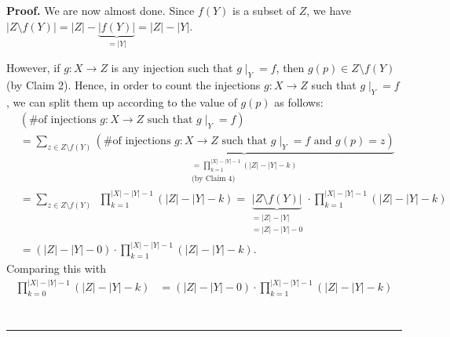 \documentclass[numbers=enddot,12pt,final,onecolumn,notitlepage]{scrartcl}%
\numberwithin{exer}{section}
\theoremstyle{definition}
\newenvironment{proof}[1][Proof]{\noindent\textbf{#1.} }{\ \rule{0.5em}{0.5em}}
\let\sumnonlimits\sum
\let\prodnonlimits\prod
\renewcommand{\sum}{\sumnonlimits\limits}
\renewcommand{\prod}{\prodnonlimits\limits}
\newenvironment{verlong}{}{}
\begin{document}
\begin{verlong}
\begin{proof}
We are now almost done. Since $f\left(  Y\right)  $ is a subset of $Z$, we
have $\left\vert Z\setminus f\left(  Y\right)  \right\vert =\left\vert
Z\right\vert -\underbrace{\left\vert f\left(  Y\right)  \right\vert
}_{=\left\vert Y\right\vert }=\left\vert Z\right\vert -\left\vert Y\right\vert
$.

However, if $g:X\rightarrow Z$ is any injection such that $\left.  g\mid
_{Y}\right.  =f$, then $g\left(  p\right)  \in Z\setminus f\left(  Y\right)  $
(by Claim 2). Hence, in order to count the injections $g:X\rightarrow Z$ such
that $\left.  g\mid_{Y}\right.  =f$, we can split them up according to the
value of $g\left(  p\right)  $ as follows:%
\begin{align*}
&  \left(  \text{\# of injections }g:X\rightarrow Z\text{ such that }\left.
g\mid_{Y}\right.  =f\right) \\
&  =\sum_{z\in Z\setminus f\left(  Y\right)  }\underbrace{\left(  \text{\# of
injections }g:X\rightarrow Z\text{ such that }\left.  g\mid_{Y}\right.
=f\text{ and }g\left(  p\right)  =z\right)  }_{\substack{=\prod_{k=1}%
^{\left\vert X\right\vert -\left\vert Y\right\vert -1}\left(  \left\vert
Z\right\vert -\left\vert Y\right\vert -k\right)  \\\text{(by Claim 4)}}}\\
&  =\sum_{z\in Z\setminus f\left(  Y\right)  }\ \ \prod_{k=1}^{\left\vert
X\right\vert -\left\vert Y\right\vert -1}\left(  \left\vert Z\right\vert
-\left\vert Y\right\vert -k\right)  =\underbrace{\left\vert Z\setminus
f\left(  Y\right)  \right\vert }_{\substack{=\left\vert Z\right\vert
-\left\vert Y\right\vert \\=\left\vert Z\right\vert -\left\vert Y\right\vert
-0}}\cdot\prod_{k=1}^{\left\vert X\right\vert -\left\vert Y\right\vert
-1}\left(  \left\vert Z\right\vert -\left\vert Y\right\vert -k\right) \\
&  =\left(  \left\vert Z\right\vert -\left\vert Y\right\vert -0\right)
\cdot\prod_{k=1}^{\left\vert X\right\vert -\left\vert Y\right\vert -1}\left(
\left\vert Z\right\vert -\left\vert Y\right\vert -k\right)  .
\end{align*}
Comparing this with
\begin{align*}
\prod_{k=0}^{\left\vert X\right\vert -\left\vert Y\right\vert -1}\left(
\left\vert Z\right\vert -\left\vert Y\right\vert -k\right)   &  =\left(
\left\vert Z\right\vert -\left\vert Y\right\vert -0\right)  \cdot\prod
_{k=1}^{\left\vert X\right\vert -\left\vert Y\right\vert -1}\left(  \left\vert
Z\right\vert -\left\vert Y\right\vert -k\right) \\

\end{align*}
\end{proof}
\end{verlong}
\end{document}
